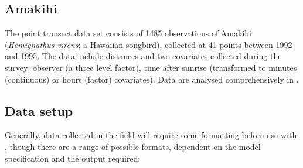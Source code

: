 \documentclass[article]{jss}\usepackage[]{graphicx}\usepackage[]{color}
\begin{document}
\subsection{Amakihi}

The point transect data set consists of 1485 observations of Amakihi (\textit{Hemignathus virens}; a Hawaiian songbird), collected at 41 points between 1992 and 1995. The data include distances and two covariates collected during the survey: observer (a three level factor), time after sunrise (transformed to minutes (continuous) or hours (factor) covariates). Data are analysed comprehensively in \cite{Marques:2007ey}.

\subsection{Data setup}

Generally, data collected in the field will require some formatting before use with , though there are a range of possible formats, dependent on the model specification and the output required:
\end{document}

